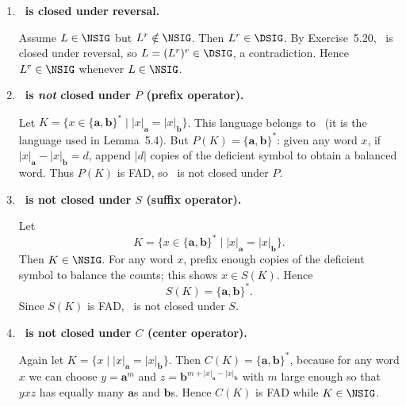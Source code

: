 \begin{enumerate}[{5.}1. ]
\begin{enumerate}[(a)]
  \item \textbf{\NSIG\ is closed under $G$.}  Let $L\in\NSIG$.  If $G(L)$ were
  FAD, then Theorem~5.11 would imply that $G(L)^b$ is FAD.  But
  $G(L)^b=L^r$, and Exercise~5.20 shows that reversal preserves the FAD
  languages.  Hence $L=(L^r)^r$ would be FAD, contradicting $L\in\NSIG$.
  Therefore $G(L)\in\NSIG$.

  \item \textbf{\NSIG\ is not closed under $b$.}  By Lemma~5.6,
  $L=\{\pmb{a}^n\pmb{b}^n\mid n\ge 0\}\in\NSIG$, but
  $L^b=\{\pmb{a}^n\mid n\ge 0\}$ is FAD.
\end{enumerate}

\item \textbf{\NSIG\ is closed under reversal.}

Assume $L\in\NSIG$ but $L^r\notin\NSIG$.  Then $L^r\in\DSIG$.  By
Exercise~5.20, \DSIG\ is closed under reversal, so
$L=(L^r)^r\in\DSIG$, a contradiction.  Hence $L^r\in\NSIG$ whenever
$L\in\NSIG$.

\item \textbf{\NSIG\ is \emph{not} closed under $P$ (prefix operator).}

Let $K=\{x\in\{\pmb{a},\pmb{b}\}^*\mid |x|_{\pmb{a}}=|x|_{\pmb{b}}\}$.  This
language belongs to \NSIG\ (it is the language used in Lemma~5.4).  But
$P(K)=\{\pmb{a},\pmb{b}\}^*$: given any word $x$, if
$|x|_{\pmb{a}}-|x|_{\pmb{b}}=d$, append $|d|$ copies of the deficient symbol to
obtain a balanced word.  Thus $P(K)$ is FAD, so \NSIG\ is not closed under $P$.

\item \textbf{\NSIG\ is not closed under $S$ (suffix operator).}

Let
\[
K=\{x\in\{\pmb{a},\pmb{b}\}^*\mid |x|_{\pmb{a}}=|x|_{\pmb{b}}\}.
\]
Then $K\in\NSIG$. For any word $x$, prefix enough copies of the deficient symbol
to balance the counts; this shows $x\in S(K)$. Hence
\[
S(K)=\{\pmb{a},\pmb{b}\}^*.
\]
Since $S(K)$ is FAD, \NSIG\ is not closed under $S$.

\item \textbf{\NSIG\ is not closed under $C$ (center operator).}

Again let $K=\{x\mid |x|_{\pmb{a}}=|x|_{\pmb{b}}\}$.  Then
$C(K)=\{\pmb{a},\pmb{b}\}^*$, because for any word $x$ we can choose
$y=\pmb{a}^m$ and $z=\pmb{b}^{m+|x|_{\pmb{a}}-|x|_{\pmb{b}}}$ with $m$ large
enough so that $yxz$ has equally many $\pmb{a}$s and $\pmb{b}$s.  Hence $C(K)$
is FAD while $K\in\NSIG$.


\end{enumerate}

